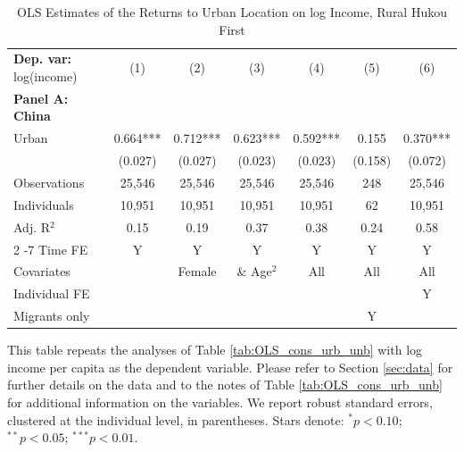 \begin{table}[htbp] \centering \begin{threeparttable}
 \caption{OLS Estimates of the Returns to Urban Location on log Income, Rural Hukou First} 
 \label{tab:OLS_CHN_hukou_rural_first_income_urban_unb} 
\begin{tabular}{l cccccc} \toprule  \textbf{Dep. var:}  log(income) 
                    &\multicolumn{1}{c}{(1)}   &\multicolumn{1}{c}{(2)}   &\multicolumn{1}{c}{(3)}   &\multicolumn{1}{c}{(4)}   &\multicolumn{1}{c}{(5)}   &\multicolumn{1}{c}{(6)}   \\
\textbf{Panel A: China} \\
Urban               &       0.664***&       0.712***&       0.623***&       0.592***&       0.155   &       0.370***\\
                    &     (0.027)   &     (0.027)   &     (0.023)   &     (0.023)   &     (0.158)   &     (0.072)   \\
\addlinespace
Observations        &      25,546   &      25,546   &      25,546   &      25,546   &         248   &      25,546   \\
Individuals         &      10,951   &      10,951   &      10,951   &      10,951   &          62   &      10,951   \\
Adj. R$^{2}$        &        0.15   &        0.19   &        0.37   &        0.38   &        0.24   &        0.58   \\
\cmidrule{2 -7} Time FE & Y & Y & Y & Y & Y & Y \\ Covariates & & Female & \& Age$^2$ & All & All & All \\ Individual FE & & & & & & Y \\ Migrants only & & & & & Y & \\ \bottomrule \end{tabular} \begin{tablenotes}[flushleft] \footnotesize \item{This table repeats the analyses of Table \ref{tab:OLS_cons_urb_unb} with log income per capita as the dependent variable. Please refer to Section \ref{sec:data} for further details on the data and to the notes of Table \ref{tab:OLS_cons_urb_unb} for additional information on the variables. We report robust standard errors, clustered at the individual level, in parentheses. Stars denote: $^{*} p<0.10$; $^{**} p<0.05$; $^{***} p<0.01$.} \end{tablenotes} \end{threeparttable} \end{table}
